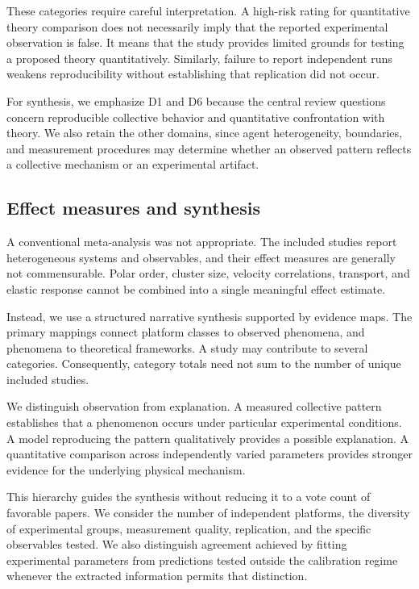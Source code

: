 These categories require careful interpretation.
A high-risk rating for quantitative theory
comparison does not necessarily imply that the
reported experimental observation is false.
It means that the study provides limited grounds
for testing a proposed theory quantitatively.
Similarly, failure to report independent runs
weakens reproducibility without establishing
that replication did not occur.

For synthesis, we emphasize D1 and D6 because
the central review questions concern reproducible
collective behavior and quantitative confrontation
with theory. We also retain the other domains,
since agent heterogeneity, boundaries, and
measurement procedures may determine whether an
observed pattern reflects a collective mechanism
or an experimental artifact.

\subsection{Effect measures and synthesis}
\label{sec:methods-synthesis}

A conventional meta-analysis was not appropriate.
The included studies report heterogeneous
systems and observables, and their effect measures
are generally not commensurable. Polar order,
cluster size, velocity correlations, transport,
and elastic response cannot be combined into
a single meaningful effect estimate.

Instead, we use a structured narrative synthesis
supported by evidence maps. The primary mappings
connect platform classes to observed phenomena,
and phenomena to theoretical frameworks.
A study may contribute to several categories.
Consequently, category totals need not sum to
the number of unique included studies.

We distinguish observation from explanation.
A measured collective pattern establishes that
a phenomenon occurs under particular experimental
conditions. A model reproducing the pattern
qualitatively provides a possible explanation.
A quantitative comparison across independently
varied parameters provides stronger evidence
for the underlying physical mechanism.

This hierarchy guides the synthesis without
reducing it to a vote count of favorable papers.
We consider the number of independent platforms,
the diversity of experimental groups,
measurement quality, replication, and the
specific observables tested. We also distinguish
agreement achieved by fitting experimental
parameters from predictions tested outside
the calibration regime whenever the extracted
information permits that distinction.

